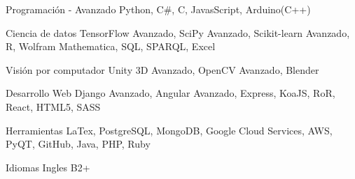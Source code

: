 

\begin{cvskills}

  \cvskill
    {Programación - Avanzado} %
    {Python, C\#, C, JavasScript, Arduino(C++)} %

  \cvskill
    {Ciencia de datos}
    {TensorFlow Avanzado, SciPy Avanzado, Scikit-learn Avanzado, R, Wolfram Mathematica, SQL, SPARQL, Excel}

  \cvskill
    {Visión por computador} %
    {Unity 3D Avanzado, OpenCV Avanzado, Blender} %

  \cvskill
    {Desarrollo Web} %
    {Django Avanzado, Angular Avanzado, Express, KoaJS, RoR, React, HTML5, SASS} %

  \cvskill
    {Herramientas}
    {LaTex, PostgreSQL, MongoDB, Google Cloud Services, AWS, PyQT, GitHub, Java, PHP, Ruby}

  \cvskill
    {Idiomas} %
    {Ingles B2+} %

\end{cvskills}
